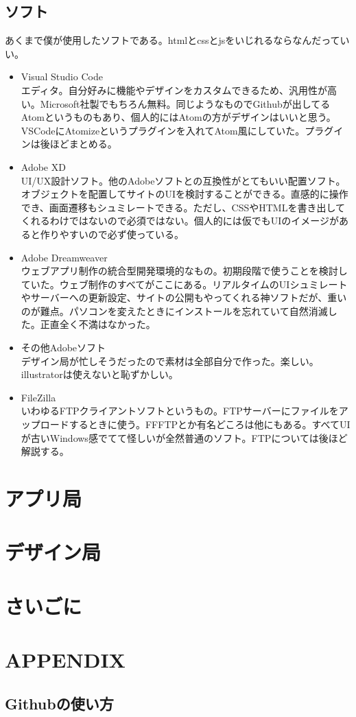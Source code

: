 \documentclass[dvipdfmx,11pt]{jarticle}
\begin{document}
 \subsection{ソフト}
 あくまで僕が使用したソフトである。htmlとcssとjsをいじれるならなんだっていい。
  \begin{itemize}
  \item Visual Studio Code\\
  エディタ。自分好みに機能やデザインをカスタムできるため、汎用性が高い。Microsoft社製でもちろん無料。同じようなものでGithubが出してるAtomというものもあり、個人的にはAtomの方がデザインはいいと思う。VSCodeにAtomizeというプラグインを入れてAtom風にしていた。プラグインは後ほどまとめる。
  \item Adobe XD\\
  UI/UX設計ソフト。他のAdobeソフトとの互換性がとてもいい配置ソフト。オブジェクトを配置してサイトのUIを検討することができる。直感的に操作でき、画面遷移もシュミレートできる。ただし、CSSやHTMLを書き出してくれるわけではないので必須ではない。個人的には仮でもUIのイメージがあると作りやすいので必ず使っている。
  \item Adobe Dreamweaver\\
  ウェブアプリ制作の統合型開発環境的なもの。初期段階で使うことを検討していた。ウェブ制作のすべてがここにある。リアルタイムのUIシュミレートやサーバーへの更新設定、サイトの公開もやってくれる神ソフトだが、重いのが難点。パソコンを変えたときにインストールを忘れていて自然消滅した。正直全く不満はなかった。
  \item その他Adobeソフト\\
  デザイン局が忙しそうだったので素材は全部自分で作った。楽しい。illustratorは使えないと恥ずかしい。
  \item FileZilla\\
  いわゆるFTPクライアントソフトというもの。FTPサーバーにファイルをアップロードするときに使う。FFFTPとか有名どころは他にもある。すべてUIが古いWindows感でてて怪しいが全然普通のソフト。FTPについては後ほど解説する。
  \end{itemize}
 \section{アプリ局}
 \section{デザイン局}
 \section{さいごに}
 \section{APPENDIX}
 \subsection{Githubの使い方}
\end{document}
